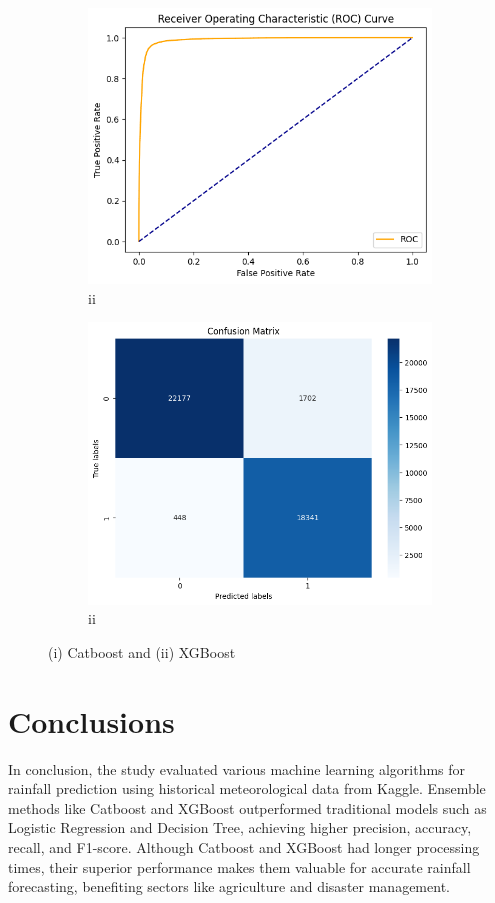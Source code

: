 \documentclass{josis}
\begin{document}
\begin{figure}[!h]
\begin{subfigure}{.24\textwidth}
    \includegraphics[width=0.95\linewidth]{ROC6.png}  
    \caption{ii}
    \label{SUBFIGURE LABEL 3}
\end{subfigure}
\begin{subfigure}{.24\textwidth}
    \centering
    \includegraphics[width=0.95\linewidth]{CM6.png}  
    \caption{ii}
    \label{SUBFIGURE LABEL 4}
\end{subfigure}
\caption{(i) Catboost and (ii) XGBoost}
\label{FIGURE LABEL3}
\end{figure}


\section{Conclusions}
In conclusion, the study evaluated various machine learning algorithms for rainfall prediction using historical meteorological data from Kaggle. Ensemble methods like Catboost and XGBoost outperformed traditional models such as Logistic Regression and Decision Tree, achieving higher precision, accuracy, recall, and F1-score. Although Catboost and XGBoost had longer processing times, their superior performance makes them valuable for accurate rainfall forecasting, benefiting sectors like agriculture and disaster management.
\end{document}
